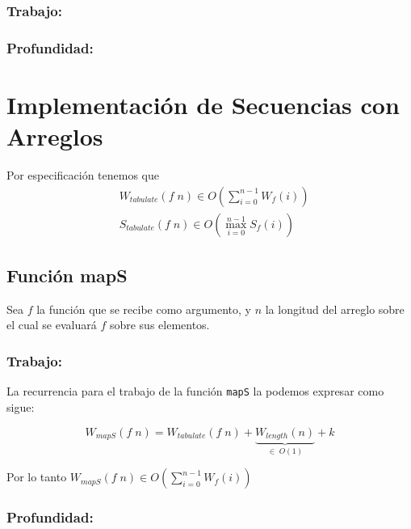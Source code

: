 \documentclass[11pt]{article}
\begin{document}
\subsubsection{Trabajo:}

\subsubsection{Profundidad:}


\section{Implementación de Secuencias con Arreglos}

Por especificación tenemos que
\begin{align*}
& W_{tabulate}(f \; n) \in O\left(\displaystyle\sum_{i=0}^{n - 1}W_f(i)\right) \\
& S_{tabulate}(f \; n) \in O\left(\displaystyle\max_{i=0}^{n - 1}S_f(i)\right)
\end{align*}

\subsection{Función mapS}

Sea $f$ la función que se recibe como argumento, y $n$ la longitud del arreglo
sobre el cual se evaluará $f$ sobre sus elementos.
\subsubsection{Trabajo:}
 
La recurrencia para el trabajo de la función \texttt{mapS} la podemos
expresar como sigue:

\begin{equation*}
    W_{mapS}(f \; n) = W_{tabulate}(f \; n) + \underbrace{W_{length}(n)}_{\in \; O(1)} + k
\end{equation*} 

Por lo tanto $ W_{mapS}(f \; n) \in O\left(\displaystyle\sum_{i=0}^{n - 1}W_f(i)\right) $

\subsubsection{Profundidad:}
\end{document}
